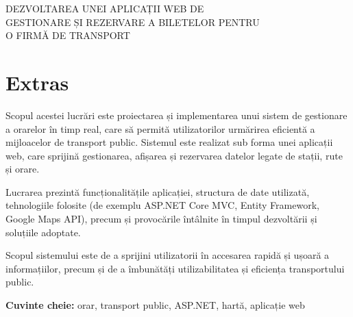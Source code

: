 
\begin{center}
{\LARGE DEZVOLTAREA UNEI APLICAȚII WEB DE} \\[0.2cm]
{\LARGE GESTIONARE ȘI REZERVARE A BILETELOR PENTRU} \\[0.2cm]
{\LARGE O FIRMĂ DE TRANSPORT} \\[1cm]
\end{center}


\section*{Extras}

Scopul acestei lucrări este proiectarea și implementarea unui sistem de gestionare a orarelor în timp real, care să permită utilizatorilor urmărirea eficientă a mijloacelor de transport public. Sistemul este realizat sub forma unei aplicații web, care sprijină gestionarea, afișarea și rezervarea datelor legate de stații, rute și orare.

Lucrarea prezintă funcționalitățile aplicației, structura de date utilizată, tehnologiile folosite (de exemplu ASP.NET Core MVC, Entity Framework, Google Maps API), precum și provocările întâlnite în timpul dezvoltării și soluțiile adoptate.

Scopul sistemului este de a sprijini utilizatorii în accesarea rapidă și ușoară a informațiilor, precum și de a îmbunătăți utilizabilitatea și eficiența transportului public.

\vspace{1cm}

\noindent\textbf{Cuvinte cheie:} orar, transport public, ASP.NET, hartă, aplicație web
